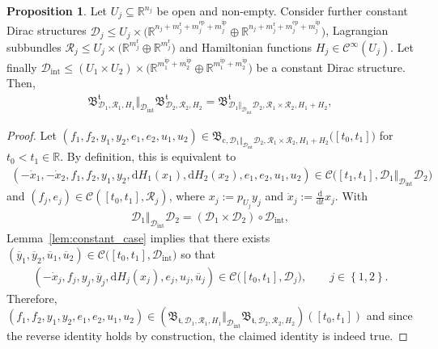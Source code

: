 \documentclass[preprint,12pt]{elsarticle}
\theoremstyle{definition}
\newtheorem{proposition}[theorem]{Proposition}
\newcommand{\set}[1]{\left\lbrace #1\right\rbrace}
\begin{document}
\begin{proposition}\label{prop:constant_case}
Let $U_j\subseteq\mathbb{R}^{n_j}$ be open and non-empty. Consider further constant Dirac structures $\mathcal{D}_j\leq U_j\times \big(\mathbb{R}^{n_j+m_j^{\mathrm{r}}+m_j^{\mathrm{ep}}+m_j^{\mathrm{ip}}}\oplus\mathbb{R}^{n_j+m_j^{\mathrm{r}}+m_j^{\mathrm{ep}}+m_j^{\mathrm{ip}}}\big)$, Lagrangian subbundles $\mathcal{R}_j\leq U_j\times\big(\mathbb{R}^{m_j^\mathrm{r}}\oplus\mathbb{R}^{m_j^\mathrm{r}}\big)$ and Hamiltonian functions $H_j\in\mathcal{C}^\infty(U_j)$. Let finally $\mathcal{D}_{\mathrm{int}}\leq (U_1\times U_2)\times\big(\mathbb{R}^{m_1^{\mathrm{ip}}+m_2^{\mathrm{ip}}}\oplus\mathbb{R}^{m_1^{\mathrm{ip}}+m_2^{\mathrm{ip}}}\big)$ be a constant Dirac structure. Then,
\begin{align*}
\mathfrak{B}^{\mathfrak{t}}_{\mathcal{D}_1,\mathcal{R}_1,H_1}\Vert_{\mathcal{D}_{\mathrm{int}}}\mathfrak{B}^{\mathfrak{t}}_{\mathcal{D}_2,\mathcal{R}_2,H_2} = \mathfrak{B}^{\mathfrak{t}}_{\mathcal{D}_1\Vert_{\mathcal{D}_{\mathrm{int}}}\mathcal{D}_2,\mathcal{R}_1\times\mathcal{R}_2,H_1+H_2},
\end{align*}
\end{proposition}
\begin{proof}
Let $(f_1,f_2,y_1,y_2,e_1,e_2,u_1,u_2)\in\mathfrak{B}_{\mathrm{c},\mathcal{D}_1\Vert_{\mathcal{D}_{\mathrm{int}}}\mathcal{D}_2,\mathcal{R}_1\times\mathcal{R}_2,H_1+H_2}\big([t_0,t_1]\big)$ for $t_0<t_1\in\mathbb{R}$. By definition, this is equivalent to
\begin{align*}
\left(-\dot{x}_1,-\dot{x}_2,f_1,f_2,y_1,y_2,\mathrm{d}H_1(x_1),\mathrm{d}H_2(x_2),e_1,e_2,u_1,u_2\right)\in\mathcal{C}\big([t_1,t_1],\mathcal{D}_1\Vert_{\mathcal{D}_{\mathrm{int}}}\mathcal{D}_2\big)
\end{align*}
and $(f_j,e_j)\in\mathcal{C}([t_0,t_1],\mathcal{R}_j)$, where $x_j := p_{U_j}y_j$ and $\dot{x}_j := \tfrac{\mathrm{d}}{\mathrm{d}t}x_j$. With
\begin{align*}
\mathcal{D}_1\Vert_{\mathcal{D}_{\mathrm{int}}}\mathcal{D}_2 = (\mathcal{D}_1\times\mathcal{D}_2)\circ\mathcal{D}_{\mathrm{int}},
\end{align*}
Lemma~\ref{lem:constant_case} implies that there exists $(\overline{y}_1,\overline{y}_2,\overline{u}_1,\overline{u}_2)\in\mathcal{C}\big([t_0,t_1],\mathcal{D}_{\mathrm{int}}\big)$ so that
\begin{align*}
\left(-\dot{x}_j,f_j,y_j,\overline{y}_j,\mathrm{d}H_j(x_j),e_j,u_j,\overline{u}_j\right)\in\mathcal{C}\big([t_0,t_1],\mathcal{D}_{j}\big),\qquad j\in\set{1,2}.
\end{align*}
Therefore, $(f_1,f_2,y_1,y_2,e_1,e_2,u_1,u_2)\in\left(\mathfrak{B}_{\mathfrak{t},\mathcal{D}_1,\mathcal{R}_1,H_1}\Vert_{\mathcal{D}_{\mathrm{int}}}\mathfrak{B}_{\mathfrak{t},\mathcal{D}_2,\mathcal{R}_2,H_2}\right)([t_0,t_1])$ and since the reverse identity holds by construction, the claimed identity is indeed true.
\end{proof}
\end{document}
